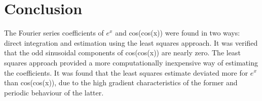 \documentclass{article}
\begin{document}
\section{Conclusion}

The Fourier series coefficients of $e^x$ and cos(cos(x)) were found in two ways:
direct integration and estimation using the least squares approach. It was
verified that the odd sinusoidal components of cos(cos(x)) are nearly zero.
The least squares approach provided a more computationally inexpensive
way of estimating the coefficients. It was found that the least squares estimate deviated more for $e^x$
than cos(cos(x)), due to the high gradient characteristics of the former and periodic behaviour of the latter.
\end{document}
